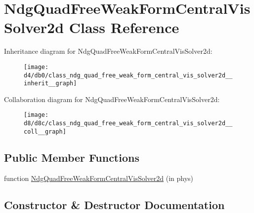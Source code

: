 \hypertarget{class_ndg_quad_free_weak_form_central_vis_solver2d}{}\section{Ndg\+Quad\+Free\+Weak\+Form\+Central\+Vis\+Solver2d Class Reference}
\label{class_ndg_quad_free_weak_form_central_vis_solver2d}


Inheritance diagram for Ndg\+Quad\+Free\+Weak\+Form\+Central\+Vis\+Solver2d\+:
\nopagebreak
\begin{figure}[H]
\begin{center}
\leavevmode
\texttt{[image: d4/db0/class\_ndg\_quad\_free\_weak\_form\_central\_vis\_solver2d\_\_inherit\_\_graph]}
\end{center}
\end{figure}


Collaboration diagram for Ndg\+Quad\+Free\+Weak\+Form\+Central\+Vis\+Solver2d\+:
\nopagebreak
\begin{figure}[H]
\begin{center}
\leavevmode
\texttt{[image: d8/d8c/class\_ndg\_quad\_free\_weak\_form\_central\_vis\_solver2d\_\_coll\_\_graph]}
\end{center}
\end{figure}
\subsection*{Public Member Functions}
\begin{DoxyCompactItemize}
\item 
function \hyperlink{class_ndg_quad_free_weak_form_central_vis_solver2d_ac81a500e17a30e97c611bee434145e3d}{Ndg\+Quad\+Free\+Weak\+Form\+Central\+Vis\+Solver2d} (in phys)
\end{DoxyCompactItemize}


\subsection{Constructor \& Destructor Documentation}
\mbox{\label{class_ndg_quad_free_weak_form_central_vis_solver2d_ac81a500e17a30e97c611bee434145e3d}} 
